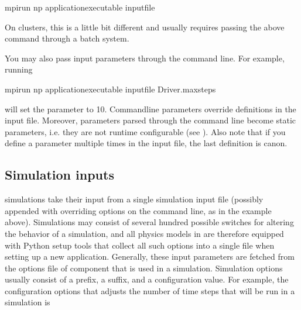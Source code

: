 \documentclass[letterpaper,10pt,english]{sphinxmanual}
\begin{document}
\begin{sphinxVerbatim}[commandchars=\\\{\},formatcom=\scriptsize]
mpirun \PYGZhy{}np  \PYGZlt{}application\PYGZus{}executable\PYGZgt{} \PYGZlt{}input\PYGZus{}file\PYGZgt{}
\end{sphinxVerbatim}

On clusters, this is a little bit different and usually requires passing the above command through a batch system.

You may also pass input parameters through the command line. For example, running

\begin{sphinxVerbatim}[commandchars=\\\{\},formatcom=\scriptsize]
mpirun \PYGZhy{}np  \PYGZlt{}application\PYGZus{}executable\PYGZgt{} \PYGZlt{}input\PYGZus{}file\PYGZgt{} Driver.max\PYGZus{}steps
\end{sphinxVerbatim}

will set the  parameter to 10.
Command\sphinxhyphen{}line parameters override definitions in the input file.
Moreover, parameters parsed through the command line become static parameters, i.e. they are not run\sphinxhyphen{}time configurable (see {\hyperref[\detokenize{Base/Control:chap-runtimeconfig}]{}}).
Also note that if you define a parameter multiple times in the input file, the last definition is canon.


\subsection{Simulation inputs}
\label{\detokenize{Base/Control:simulation-inputs}}
 simulations take their input from a single simulation input file (possibly appended with overriding options on the command line, as in the example above).
Simulations may consist of several hundred possible switches for altering the behavior of a simulation, and all physics models in  are therefore equipped with Python setup tools that collect all such options into a single file when setting up a new application.
Generally, these input parameters are fetched from the options file of component that is used in a simulation.
Simulation options usually consist of a prefix, a suffix, and a configuration value.
For example, the configuration options that adjusts the number of time steps that will be run in a simulation is
\end{document}
